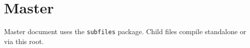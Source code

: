 \documentclass{article}
\begin{document}
\section{Master}
\label{sec:master}

Master document uses the \texttt{subfiles} package. Child files compile
standalone or via this root.


\end{document}
